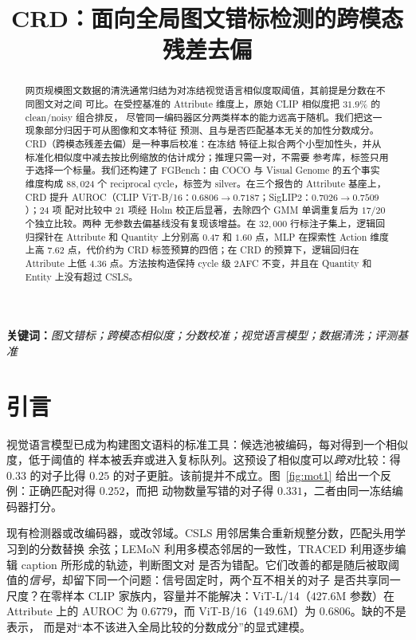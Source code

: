 \documentclass[10pt,twocolumn,a4paper]{ctexart}
\title{\bfseries CRD：面向全局图文错标检测的跨模态残差去偏}
\author{}
\date{}
\begin{document}
\maketitle

\begin{abstract}
\noindent
网页规模图文数据的清洗通常归结为对冻结视觉语言相似度取阈值，其前提是分数在不同图文对之间
可比。在受控基准的 Attribute 维度上，原始 CLIP 相似度把 $31.9\%$ 的 clean/noisy 组合排反，
尽管同一编码器区分两类样本的能力远高于随机。我们把这一现象部分归因于可从图像和文本特征
预测、且与是否匹配基本无关的加性分数成分。CRD（跨模态残差去偏）是一种事后校准：在冻结
特征上拟合两个小型加性头，并从标准化相似度中减去按比例缩放的估计成分；推理只需一对，不需要
参考库，标签只用于选择一个标量。我们还构建了 FGBench：由 COCO 与 Visual Genome 的五个事实
维度构成 $88{,}024$ 个 reciprocal cycle，标签为 silver。在三个报告的 Attribute 基座上，
CRD 提升 AUROC（CLIP ViT-B/16：$0.6806\to0.7187$；SigLIP2：$0.7026\to0.7509$）；$24$ 项
配对比较中 $21$ 项经 Holm 校正后显著，去除四个 GMM 单调重复后为 $17/20$ 个独立比较。两种
无参数去偏基线没有复现该增益。在 $32{,}000$ 行标注子集上，逻辑回归探针在 Attribute 和
Quantity 上分别高 $0.47$ 和 $1.60$ 点，MLP 在探索性 Action 维度上高 $7.62$ 点，代价约为
CRD 标签预算的四倍；在 CRD 的预算下，逻辑回归在 Attribute 上低 $4.36$ 点。方法按构造保持
cycle 级 2AFC 不变，并且在 Quantity 和 Entity 上没有超过 CSLS。
\end{abstract}

\noindent\textbf{关键词：}\emph{图文错标；跨模态相似度；分数校准；视觉语言模型；数据清洗；评测基准}

\section{引言}
\label{sec:intro-cn}

视觉语言模型已成为构建图文语料的标准工具：候选池被编码，每对得到一个相似度，低于阈值的
样本被丢弃或进入复标队列。这预设了相似度可以\emph{跨对}比较：得 $0.33$ 的对子比得 $0.25$
的对子更脏。该前提并不成立。图~\ref{fig:mot1} 给出一个反例：正确匹配对得 $0.252$，而把
动物数量写错的对子得 $0.331$，二者由同一冻结编码器打分。

现有检测器或改编码器，或改邻域。CSLS 用邻居集合重新规整分数，匹配头用学习到的分数替换
余弦；LEMoN 利用多模态邻居的一致性，TRACED 利用逐步编辑 caption 所形成的轨迹，判断图文对
是否为错配。它们改善的都是随后被取阈值的\emph{信号}，却留下同一个问题：信号固定时，两个互不相关的对子
是否共享同一尺度？在零样本 CLIP 家族内，容量并不能解决：ViT-L/14（$427.6$M 参数）在
Attribute 上的 AUROC 为 $0.6779$，而 ViT-B/16（$149.6$M）为 $0.6806$。缺的不是表示，
而是对“本不该进入全局比较的分数成分”的显式建模。
\end{document}
